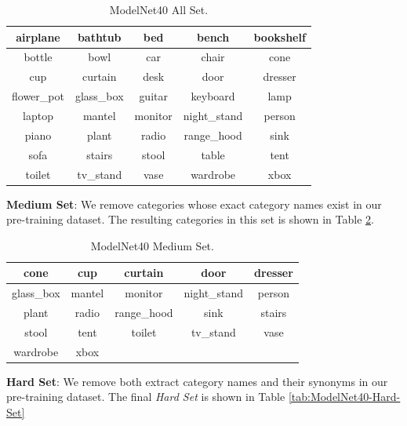 \documentclass[10pt,twocolumn,letterpaper]{article}
\begin{document}
\begin{table}[htb]
    \small
    \begin{tabular}{ccccc}
        \toprule
        airplane & bathtub & bed & bench & bookshelf \\
        \midrule
        bottle & bowl & car & chair & cone \\
        \midrule
        cup& curtain& desk& door& dresser \\
        \midrule
        flower\_pot& glass\_box& guitar& keyboard& lamp \\
        \midrule
        laptop& mantel& monitor& night\_stand& person \\
        \midrule
        piano& plant& radio& range\_hood& sink \\
        \midrule
        sofa& stairs& stool& table& tent \\
        \midrule
        toilet& tv\_stand& vase& wardrobe& xbox \\
        \bottomrule
    \end{tabular}
    \caption{ModelNet40 All Set.}
    \label{tab:ModelNet40-All-Set}
\end{table}

\noindent\textbf{Medium Set}: We remove categories whose
exact category names exist in our pre-training dataset. The resulting categories in this set is shown in Table \ref{tab:ModelNet40-Medium-Set}.

\begin{table}[htb]
    \small
    \begin{tabular}{ccccc}
        \toprule
        cone& cup& curtain& door& dresser \\
        \midrule
        glass\_box& mantel& monitor& night\_stand& person \\
        \midrule
        plant& radio& range\_hood& sink& stairs \\
        \midrule
        stool& tent& toilet& tv\_stand& vase \\
        \midrule
        wardrobe& xbox \\
        \bottomrule
    \end{tabular}
    \caption{ModelNet40 Medium Set.}
    \label{tab:ModelNet40-Medium-Set}
\end{table}

\noindent\textbf{Hard Set}: We remove both extract category names and their synonyms in our pre-training dataset. The final \emph{Hard Set} is shown in Table \ref{tab:ModelNet40-Hard-Set}
\end{document}
